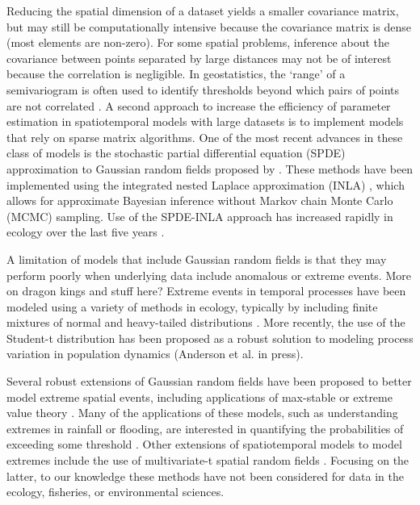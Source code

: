 \documentclass[12pt,english]{article}
\begin{document}
\begin{spacing}{1.25}
Reducing the spatial dimension of a dataset yields a smaller covariance matrix,
but may still be computationally intensive because the covariance matrix is
dense (most elements are non-zero). For some spatial problems, inference about
the covariance between points separated by large distances may not be of
interest because the correlation is negligible. In geostatistics, the `range'
of a semivariogram is often used to identify thresholds beyond which pairs of
points are not correlated \citep{rossi1992}. A second approach to increase the
efficiency of parameter estimation in spatiotemporal models with large datasets
is to implement models that rely on sparse matrix algorithms. One of the most
recent advances in these class of models is the stochastic partial differential
equation (SPDE) approximation to Gaussian random fields proposed by
\citet{lindgren2011}. These methods have been implemented using the integrated
nested Laplace approximation (INLA) \citep{rue2009}, which allows for
approximate Bayesian inference without Markov chain Monte Carlo (MCMC)
sampling. Use of the SPDE-INLA approach has increased rapidly in ecology over
the last five years \citep[e.g.][]{illian2013, ono2016}.

A limitation of models that include Gaussian random fields is that they may
perform poorly when underlying data include anomalous or extreme events. More
on dragon kings and stuff here? Extreme events in temporal processes have been
modeled using a variety of methods in ecology, typically by including finite
mixtures of normal and
heavy-tailed distributions \citep{everitt1996, ward2007, thorson2011}.
More recently, the use of the Student-t distribution
has been proposed as a robust solution to modeling process variation in
population dynamics (Anderson et al. in press).

Several robust extensions of Gaussian random fields have been proposed to
better model extreme spatial events, including applications of max-stable or
extreme value theory \citep{davison2012, davison2012a}. Many of the
applications of these models, such as understanding extremes in rainfall or
flooding, are interested in quantifying the probabilities of exceeding some
threshold \citep{davis2008}. Other extensions of spatiotemporal models to model
extremes include the use of multivariate-t spatial random fields
\citep{roislien2007}. Focusing on the latter, to our knowledge these methods
have not been considered for data in the ecology, fisheries, or environmental
sciences.


\end{spacing}
\end{document}
